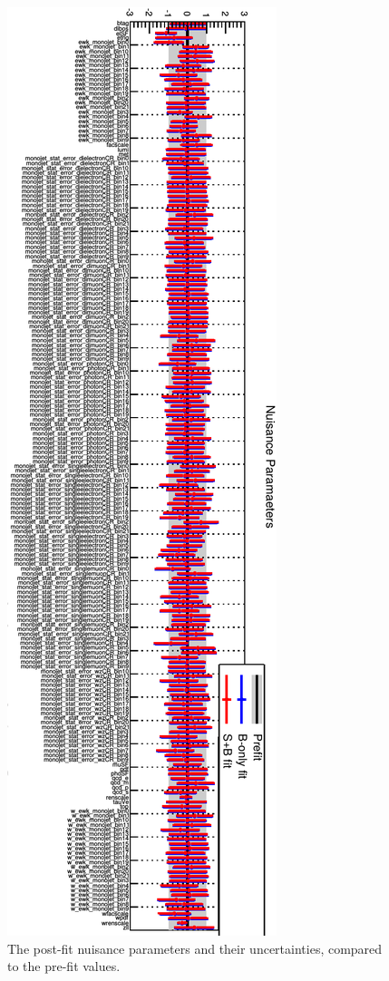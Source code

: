 \begin{figure}[ht]
  \centering
 \includegraphics[width=.44\textwidth]{nuisance_new.png} 
 \caption{The post-fit nuisance parameters and their uncertainties, compared to the pre-fit values.}
 \label{fig:nuisance}
\end{figure}


